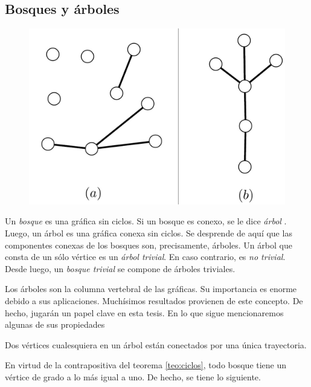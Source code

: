 \subsection{Bosques y árboles} \label{sec:arboles}
\begin{figure}
\vspace{-1cm}
 \centering
  \includegraphics[scale=0.25]{img/imgchapter1/arboles.jpg}
  \caption{}
  \label{fig:arboles}
\end{figure}
Un \textit{bosque} es una gráfica sin ciclos. Si un bosque es conexo, se le dice \textit{árbol} . Luego, un árbol es una gráfica conexa sin ciclos. Se desprende de aquí que las componentes conexas de los bosques son, precisamente, árboles. Un  árbol que consta de un sólo vértice es un \textit{árbol trivial}. En caso contrario, es \textit{no trivial}. Desde luego, un \textit{bosque trivial} se compone de árboles triviales. 

Los árboles son la columna vertebral de las gráficas. Su importancia es enorme  debido a sus aplicaciones. Muchísimos resultados provienen de este concepto. De hecho, jugarán un papel clave en esta tesis. En lo que sigue mencionaremos algunas de sus propiedades

\begin{prop}\label{prop:treepath}
Dos vértices cualesquiera en un árbol están conectados por una única trayectoria.
\end{prop}

En virtud de la contrapositiva del teorema \ref{teo:ciclos}, todo bosque tiene un vértice de grado a lo más igual a uno. De hecho, se tiene lo siguiente.

